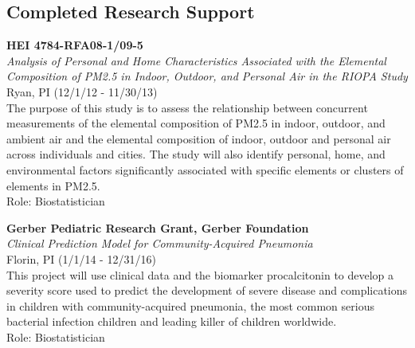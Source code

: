 \documentclass{nihbiosketch}
\begin{document}

\subsection*{Completed Research Support}

\bigskip

\textbf{HEI 4784-RFA08-1/09-5}\\
\emph{Analysis of Personal and Home Characteristics Associated with the
	Elemental Composition of PM2.5 in Indoor, Outdoor, and Personal Air in
	the RIOPA Study}\\
Ryan, PI (12/1/12 - 11/30/13)\\
The purpose of this study is to assess the relationship between
concurrent measurements of the elemental composition of PM2.5 in indoor,
outdoor, and ambient air and the elemental composition of indoor,
outdoor and personal air across individuals and cities. The study will
also identify personal, home, and environmental factors significantly
associated with specific elements or clusters of elements in PM2.5.\\
Role: Biostatistician

\bigskip

\textbf{Gerber Pediatric Research Grant, Gerber Foundation}\\
\emph{Clinical Prediction Model for Community-Acquired Pneumonia}\\
Florin, PI (1/1/14 - 12/31/16)\\
This project will use clinical data and the biomarker procalcitonin to
develop a severity score used to predict the development of severe
disease and complications in children with community-acquired pneumonia,
the most common serious bacterial infection children and leading killer
of children worldwide.\\
Role: Biostatistician
\end{document}

